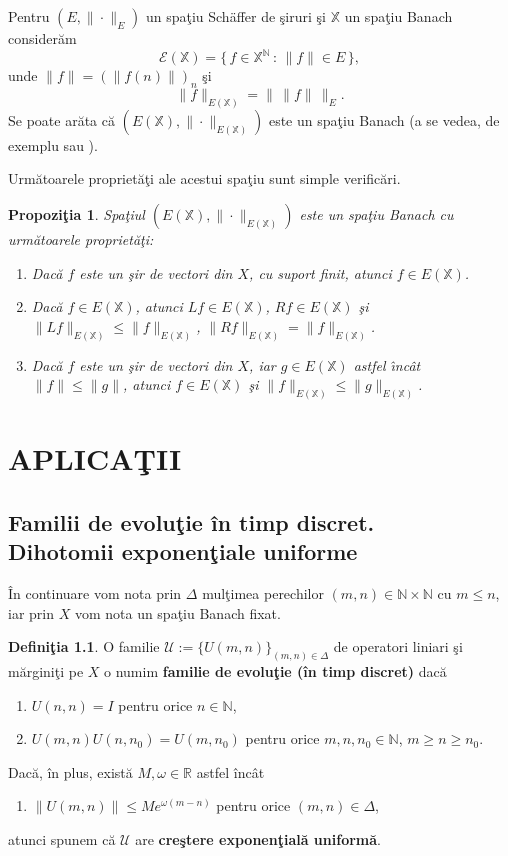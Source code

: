 \documentclass[ a4paper, 12pt]{report}
\newcommand{\R}{\mathbb{R}}
\newcommand{\N}{\mathbb{N}}
\newcommand{\X}{\mathbb{X}}
\newcommand{\defnemph}[1]{\textbf{#1}}
\newtheorem{prop}[theorem]{\bf Propozi\c tia }
\theoremstyle{definition}
\newtheorem{definition}{\bf Defini\c tia}[section]
\theoremstyle{remark}
\numberwithin{equation}{section}
\begin{document}
\bigskip

Pentru $(E,\|\cdot\|_{E})$ un spa\c tiu Sch\"{a}ffer de \c siruri \c si $\X$ un spa\c tiu Banach
consider\u am
$$\mathcal{E}(\X)=\{\,f\in {\X}^{\N}\,:\,\|f\|\in E\,\},$$ unde $\|f\| = (\|f(n)\|)_n$ \c si
$$\|f\|_{E(\X)} = \|\, \|f\| \,\|_{E}.$$ Se poate ar\u ata c\u a
$(E(\X),\|\cdot\|_{E(\X)})$ este un spa\c tiu Banach (a se vedea, de exemplu
\cite[Remark~2.1]{PredaPoganJDE05} sau
\cite[Lemma~3.8]{coffmanschaffer67}).

Urm\u atoarele propriet\u a\c ti ale acestui spa\c tiu sunt simple verific\u ari.

\begin{prop}
Spa\c tiul $(E(\X),\|\cdot\|_{E(\X)})$ este un spa\c tiu Banach cu urm\u atoarele propriet\u a\c ti:
\begin{enumerate}
\item[(i)] Dac\u a  $f$ este un \c sir de vectori din $X$, cu suport finit, atunci $f\in E(\X)$.
\item[(ii)] Dac\u a $f\in E(\X)$, atunci $Lf \in E(\X)$, $Rf \in E(\X)$ \c si
    $\|Lf\|_{E(\X)}\leq \|f\|_{E(\X)}$, $\|Rf\|_{E(\X)}=\|f\|_{E(\X)}$.
\item[(iii)] Dac\u a $f$ este un \c sir de vectori din $X$, iar $g\in E(\X)$ astfel \^\i nc\^ at $\|f\|\leq\|g\|$, atunci $f\in E(\X)$ \c si
    $\|f\|_{E(\X)}\leq\|g\|_{E(\X)}$.
\end{enumerate}
\end{prop}



\chapter{APLICA\c TII}
\section{Familii de evolu\c tie \^in timp discret.\\ Dihotomii exponen\c tiale uniforme}


\^In continuare vom nota prin $\Delta$ mul\c timea perechilor $(m, n) \in \mathbb{N}\times \mathbb{N}$ cu $m \leq n$, iar prin $X$ vom nota un spa\c tiu Banach fixat.

\begin{definition}
O familie $\mathcal{U}:=\{U(m,n)\}_{(m,n)\in\Delta}$ de operatori liniari \c si m\u argini\c ti  pe $X$ o numim
\defnemph{familie de evolu\c tie (\^in timp discret)} dac\u a
\begin{enumerate}
\item[$(e_1)$] $U(n,n)=I$ pentru orice $n\in\N$,
\item[$(e_2)$] $U(m,n)U(n,n_0)=U(m,n_0)$ pentru orice $m, n, n_0\in\N$, $m\geq n\geq n_0$.
\end{enumerate}
Dac\u a, \^in plus, exist\u a $M,\omega\in\R$ astfel \^inc\^at
\begin{enumerate}
\item[$(e_3)$] $\|U(m,n)\|\leq Me^{\omega(m-n)}$ pentru orice $(m,n)\in\Delta$,
\end{enumerate}
atunci spunem c\u a $\mathcal{U}$ are \defnemph{cre\c stere exponen\c tial\u a uniform\u a}.
\end{definition}
\end{document}

